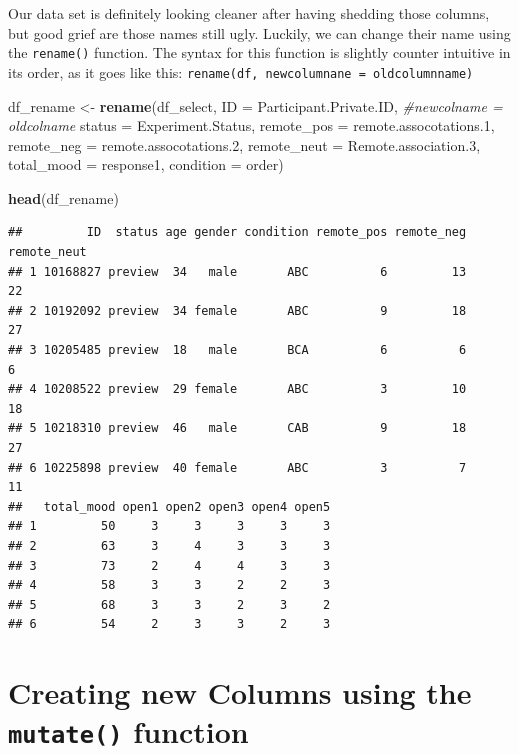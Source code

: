 \documentclass[
]{book}
\newenvironment{Shaded}{\begin{snugshade}}{\end{snugshade}}
\newcommand{\AttributeTok}[1]{\textcolor[rgb]{0.13,0.29,0.53}{#1}}
\newcommand{\CommentTok}[1]{\textcolor[rgb]{0.56,0.35,0.01}{\textit{#1}}}
\newcommand{\FloatTok}[1]{\textcolor[rgb]{0.00,0.00,0.81}{#1}}
\newcommand{\FunctionTok}[1]{\textcolor[rgb]{0.13,0.29,0.53}{\textbf{#1}}}
\newcommand{\NormalTok}[1]{#1}
\newcommand{\OtherTok}[1]{\textcolor[rgb]{0.56,0.35,0.01}{#1}}
\begin{document}
Our data set is definitely looking cleaner after having shedding those columns, but good grief are those names still ugly. Luckily, we can change their name using the \texttt{rename()} function. The syntax for this function is slightly counter intuitive in its order, as it goes like this: \texttt{rename(df,\ newcolumnane\ =\ oldcolumnname)}

\begin{Shaded}
\begin{Highlighting}[]
\NormalTok{df\_rename }\OtherTok{\textless{}{-}} \FunctionTok{rename}\NormalTok{(df\_select, }
                    \AttributeTok{ID =}\NormalTok{ Participant.Private.ID, }\CommentTok{\#newcolname = oldcolname}
                    \AttributeTok{status =}\NormalTok{ Experiment.Status,}
                    \AttributeTok{remote\_pos =}\NormalTok{ remote.assocotations}\FloatTok{.1}\NormalTok{,}
                    \AttributeTok{remote\_neg =}\NormalTok{ remote.assocotations}\FloatTok{.2}\NormalTok{,}
                    \AttributeTok{remote\_neut =}\NormalTok{ Remote.association}\FloatTok{.3}\NormalTok{,}
                    \AttributeTok{total\_mood =}\NormalTok{ response1,}
                    \AttributeTok{condition =}\NormalTok{ order)}

\FunctionTok{head}\NormalTok{(df\_rename)}
\end{Highlighting}
\end{Shaded}

\begin{verbatim}
##         ID  status age gender condition remote_pos remote_neg remote_neut
## 1 10168827 preview  34   male       ABC          6         13          22
## 2 10192092 preview  34 female       ABC          9         18          27
## 3 10205485 preview  18   male       BCA          6          6           6
## 4 10208522 preview  29 female       ABC          3         10          18
## 5 10218310 preview  46   male       CAB          9         18          27
## 6 10225898 preview  40 female       ABC          3          7          11
##   total_mood open1 open2 open3 open4 open5
## 1         50     3     3     3     3     3
## 2         63     3     4     3     3     3
## 3         73     2     4     4     3     3
## 4         58     3     3     2     2     3
## 5         68     3     3     2     3     2
## 6         54     2     3     3     2     3
\end{verbatim}

\hypertarget{creating-new-columns-using-the-mutate-function}{%
\section{\texorpdfstring{Creating new Columns using the \texttt{mutate()} function}{Creating new Columns using the mutate() function}}\label{creating-new-columns-using-the-mutate-function}}
\end{document}
